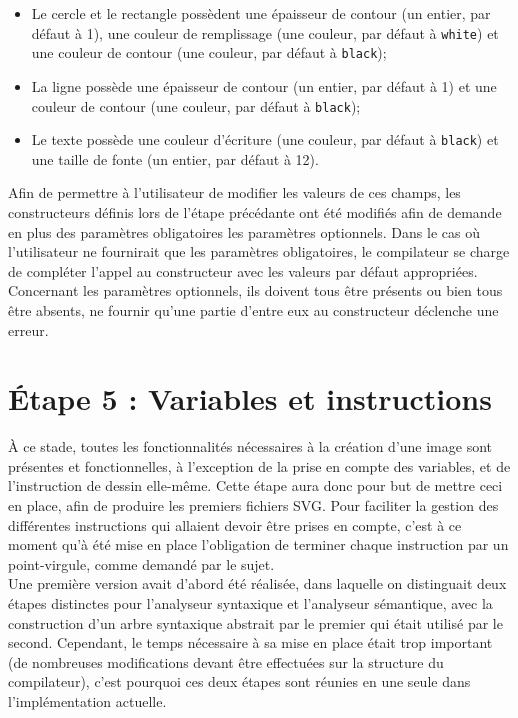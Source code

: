 \documentclass[a4paper, 12pt]{report}
\begin{document}
	\begin{itemize}
		\item Le cercle et le rectangle possèdent une épaisseur de contour (un entier, par défaut à 1), une couleur de remplissage (une couleur, par défaut à \texttt{white}) et une couleur de contour (une couleur, par défaut à \texttt{black});
		\item La ligne possède une épaisseur de contour (un entier, par défaut à 1) et une couleur de contour (une couleur, par défaut à \texttt{black});
		\item Le texte possède une couleur d'écriture (une couleur, par défaut à \texttt{black}) et une taille de fonte (un entier, par défaut à 12).\\
	\end{itemize}
	
	Afin de permettre à l'utilisateur de modifier les valeurs de ces champs, les constructeurs définis lors de l'étape précédante ont été modifiés afin de demande en plus des paramètres obligatoires les paramètres optionnels. Dans le cas où l'utilisateur ne fournirait que les paramètres obligatoires, le compilateur se charge de compléter l'appel au constructeur avec les valeurs par défaut appropriées. Concernant les paramètres optionnels, ils doivent tous être présents ou bien tous être absents, ne fournir qu'une partie d'entre eux au constructeur déclenche une erreur.
	
\chapter{\'Etape 5 : Variables et instructions}

	\`A ce stade, toutes les fonctionnalités nécessaires à la création d'une image sont présentes et fonctionnelles, à l'exception de la prise en compte des variables, et de l'instruction de dessin elle-même. Cette étape aura donc pour but de mettre ceci en place, afin de produire les premiers fichiers SVG. Pour faciliter la gestion des différentes instructions qui allaient devoir être prises en compte, c'est à ce moment qu'à été mise en place l'obligation de terminer chaque instruction par un point-virgule, comme demandé par le sujet.\\
	
	Une première version avait d'abord été réalisée, dans laquelle on distinguait deux étapes distinctes pour l'analyseur syntaxique et l'analyseur sémantique, avec la construction d'un arbre syntaxique abstrait par le premier qui était utilisé par le second. Cependant, le temps nécessaire à sa mise en place était trop important (de nombreuses modifications devant être effectuées sur la structure du compilateur), c'est pourquoi ces deux étapes sont réunies en une seule dans l'implémentation actuelle.
	
\end{document}
